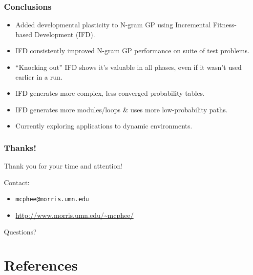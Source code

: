 \documentclass{beamer}
\newcommand{\linespace}{\vskip 0.25cm}
\begin{document}
\begin{frame}
\frametitle{Conclusions}

\begin{itemize}
  \item Added developmental plasticity to N-gram GP using Incremental Fitness-based Development (IFD).
\end{itemize}

\begin{itemize}
  \item IFD consistently improved N-gram GP performance on suite of test problems.
  
  \linespace
  
  \item ``Knocking out'' IFD shows it's valuable in all phases, even if it wasn't used earlier in a run.

  \linespace
  
  \item IFD generates more complex, less converged probability tables.
  \item IFD generates more modules/loops \& uses more low-probability paths.
\end{itemize}

\begin{itemize}
  \item Currently exploring applications to dynamic environments.
\end{itemize}

\end{frame}

\begin{frame}
	\frametitle{Thanks!}
	
	Thank you for your time and attention!
		
	\linespace
	\linespace
	
	Contact:  
	\begin{itemize}
		\item \texttt{mcphee@morris.umn.edu}
		\item \url{http://www.morris.umn.edu/~mcphee/}
	\end{itemize}
	
	\linespace
	\linespace
	
	\begin{center}
	{\huge Questions?}
	\end{center}
\end{frame}

\section*{References}
\end{document}
